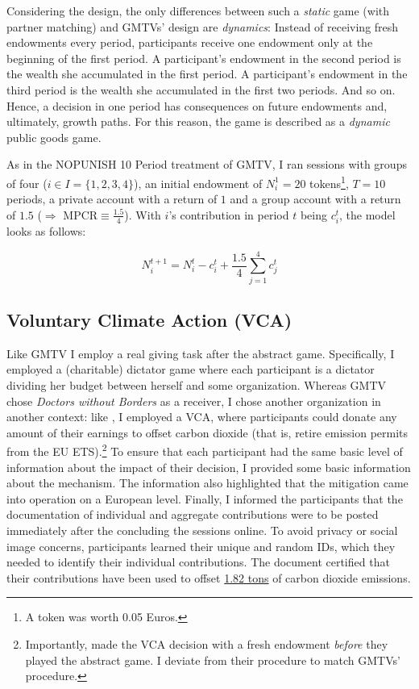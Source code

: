 \documentclass[
  authoryear,
  review,
  3p,
  onecolumn]{elsarticle}
\begin{document}
Considering the design, the only differences between such a
\emph{static} game (with partner matching) and GMTVs' design are
\emph{dynamics}: Instead of receiving fresh endowments every period,
participants receive one endowment only at the beginning of the first
period. A participant's endowment in the second period is the wealth she
accumulated in the first period. A participant's endowment in the third
period is the wealth she accumulated in the first two periods. And so
on. Hence, a decision in one period has consequences on future
endowments and, ultimately, growth paths. For this reason, the game is
described as a \emph{dynamic} public goods game.

As in the NOPUNISH 10 Period treatment of GMTV, I ran sessions with
groups of four (\(i \in I=\{1,2,3,4\}\)), an initial endowment of
\(N_i^1 = 20\) tokens\footnote{A token was worth 0.05 Euros.}, \(T=10\)
periods, a private account with a return of \(1\) and a group account
with a return of \(1.5\) (\(\Rightarrow\) MPCR\(\equiv \frac{1.5}{4}\)).
With \(i\)'s contribution in period \(t\) being \(c_i^t\), the model
looks as follows:

\[
N_i^{t+1}=N_i^t - c_i^t + \frac{1.5}{4}\sum_{j=1}^4 c_j^t
\]

\hypertarget{voluntary-climate-action-vca}{%
\subsection{Voluntary Climate Action
(VCA)}\label{voluntary-climate-action-vca}}

Like GMTV I employ a real giving task after the abstract game.
Specifically, I employed a (charitable) dictator game where each
participant is a dictator dividing her budget between herself and some
organization. Whereas GMTV chose \emph{Doctors without Borders} as a
receiver, I chose another organization in another context: like
\citet{GKLS2020}, I employed a VCA, where participants could donate any
amount of their earnings to offset carbon dioxide (that is, retire
emission permits from the EU ETS).\footnote{Importantly,
  \citet{GKLS2020} made the VCA decision with a fresh endowment
  \emph{before} they played the abstract game. I deviate from their
  procedure to match GMTVs' procedure.} To ensure that each participant
had the same basic level of information about the impact of their
decision, I provided some basic information about the mechanism. The
information also highlighted that the mitigation came into operation on
a European level. Finally, I informed the participants that the
documentation of individual and aggregate contributions were to be
posted immediately after the concluding the sessions online. To avoid
privacy or social image concerns, participants learned their unique and
random IDs, which they needed to identify their individual
contributions. The document certified that their contributions have been
used to offset
\href{https://www.compensators.org/compensatelist/?searchterm=stefan+traub}{1.82
tons} of carbon dioxide emissions.
\end{document}

